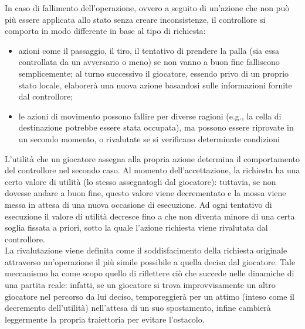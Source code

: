 In caso di fallimento dell'operazione, ovvero a seguito di un'azione che non può più essere applicata allo stato senza creare inconsistenze, il controllore si comporta in modo differente in base al tipo di richiesta:

\begin{itemize}
	\item azioni come il passaggio, il tiro, il tentativo di prendere la palla (sia essa controllata da un avversario o meno) se non vanno a buon fine falliscono semplicemente; al turno successivo il giocatore, essendo privo di un proprio stato locale, elaborerà una nuova azione basandosi sulle informazioni fornite dal controllore;
	\item le azioni di movimento possono fallire per diverse ragioni (e.g., la cella di destinazione potrebbe essere stata occupata), ma possono essere riprovate in un secondo momento, o rivalutate se si verificano determinate condizioni
\end{itemize}

L'utilità che un giocatore assegna alla propria azione determina il comportamento del controllore nel secondo caso. Al momento dell'accettazione, la richiesta ha una certo valore di utilità (lo stesso assegnatogli dal giocatore): tuttavia, se non dovesse andare a buon fine, questo valore viene decrementato e la mossa viene messa in attesa di una nuova occasione di esecuzione. Ad ogni tentativo di esecuzione il valore di utilità decresce fino a che non diventa minore di una certa soglia fissata a priori, sotto la quale l'azione richiesta viene rivalutata dal controllore.\\

La rivalutazione viene definita come il soddisfacimento della richiesta originale attraverso un'operazione il più simile possibile a quella decisa dal giocatore. Tale meccanismo ha come scopo quello di riflettere ciò che succede nelle dinamiche di una partita reale: infatti, se un giocatore si trova improvvisamente un altro giocatore nel percorso da lui deciso, temporeggierà per un attimo (inteso come il decremento dell'utilità) nell'attesa di un suo spostamento, infine cambierà leggermente la propria traiettoria per evitare l'ostacolo.\\

